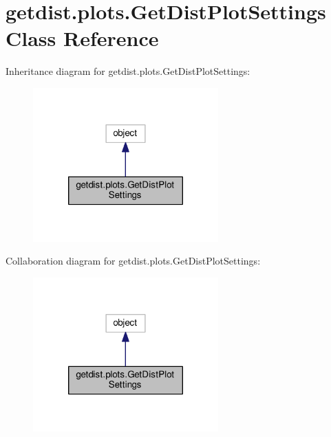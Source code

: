 \hypertarget{classgetdist_1_1plots_1_1GetDistPlotSettings}{}\section{getdist.\+plots.\+Get\+Dist\+Plot\+Settings Class Reference}
\label{classgetdist_1_1plots_1_1GetDistPlotSettings}


Inheritance diagram for getdist.\+plots.\+Get\+Dist\+Plot\+Settings\+:
\nopagebreak
\begin{figure}[H]
\begin{center}
\leavevmode
\includegraphics[width=202pt]{classgetdist_1_1plots_1_1GetDistPlotSettings__inherit__graph}
\end{center}
\end{figure}


Collaboration diagram for getdist.\+plots.\+Get\+Dist\+Plot\+Settings\+:
\nopagebreak
\begin{figure}[H]
\begin{center}
\leavevmode
\includegraphics[width=202pt]{classgetdist_1_1plots_1_1GetDistPlotSettings__coll__graph}
\end{center}
\end{figure}

